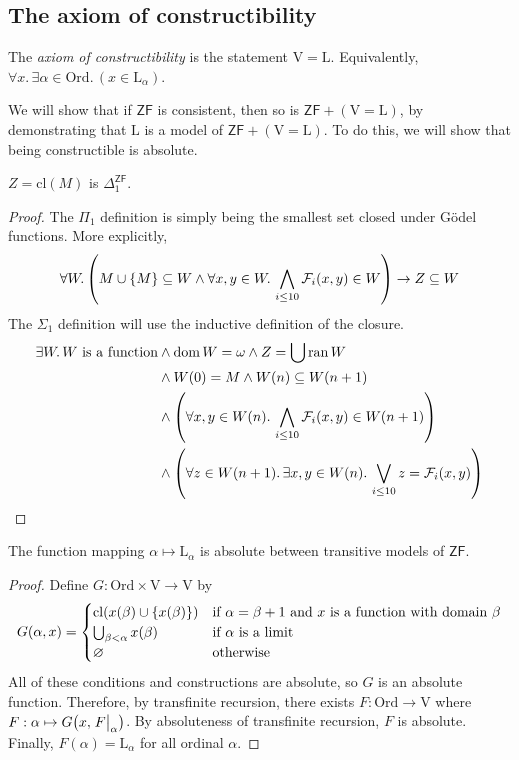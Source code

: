 \subsection{The axiom of constructibility}
\begin{definition}
    The \emph{axiom of constructibility} is the statement \( \mathrm{V} = \mathrm{L} \).
    Equivalently, \( \forall x.\, \exists \alpha \in \mathrm{Ord}.\, (x \in \mathrm{L}_\alpha) \).
\end{definition}
We will show that if \( \mathsf{ZF} \) is consistent, then so is \( \mathsf{ZF} + (\mathrm{V} = \mathrm{L}) \), by demonstrating that \( \mathrm{L} \) is a model of \( \mathsf{ZF} + (\mathrm{V} = \mathrm{L}) \).
To do this, we will show that being constructible is absolute.
\begin{lemma}
    \( Z = \mathrm{cl}(M) \) is \( \Delta_1^{\mathsf{ZF}} \).
\end{lemma}
\begin{proof}
    The \( \Pi_1 \) definition is simply being the smallest set closed under G\"odel functions.
    More explicitly,
    \[ \forall W.\, \qty(M \cup \qty{M} \subseteq W \wedge \forall x, y \in W.\, \bigwedge_{i \leq 10} \mathcal F_i(x, y) \in W) \to Z \subseteq W \]
    The \( \Sigma_1 \) definition will use the inductive definition of the closure.
    \begin{align*}
        \exists W.\, W \text{ is a function} &\wedge \operatorname{dom} W = \omega \wedge Z = \bigcup \operatorname{ran} W \\
        &\wedge W(0) = M \wedge W(n) \subseteq W(n+1) \\
        &\wedge \qty(\forall x, y \in W(n).\, \bigwedge_{i \leq 10} \mathcal F_i(x, y) \in W(n+1)) \\
        &\wedge \qty(\forall z \in W(n+1).\, \exists x, y \in W(n).\, \bigvee_{i \leq 10} z = \mathcal F_i(x, y))
    \end{align*}
\end{proof}
\begin{lemma}
    The function mapping \( \alpha \mapsto \mathrm{L}_\alpha \) is absolute between transitive models of \( \mathsf{ZF} \).
\end{lemma}
\begin{proof}
    Define \( G : \mathrm{Ord} \times \mathrm{V} \to \mathrm{V} \) by
    \[ G(\alpha, x) = \begin{cases}
        \mathrm{cl}(x(\beta) \cup \qty{x(\beta)}) & \text{if } \alpha = \beta + 1 \text{ and } x \text{ is a function with domain } \beta \\
        \bigcup_{\beta < \alpha} x(\beta) & \text{if } \alpha \text{ is a limit} \\
        \varnothing & \text{otherwise}
    \end{cases} \]
    All of these conditions and constructions are absolute, so \( G \) is an absolute function.
    Therefore, by transfinite recursion, there exists \( F : \mathrm{Ord} \to \mathrm{V} \) where \( F : \alpha \mapsto G\qty(x, \eval{F}_\alpha) \).
    By absoluteness of transfinite recursion, \( F \) is absolute.
    Finally, \( F(\alpha) = \mathrm{L}_\alpha \) for all ordinal \( \alpha \).
\end{proof}
